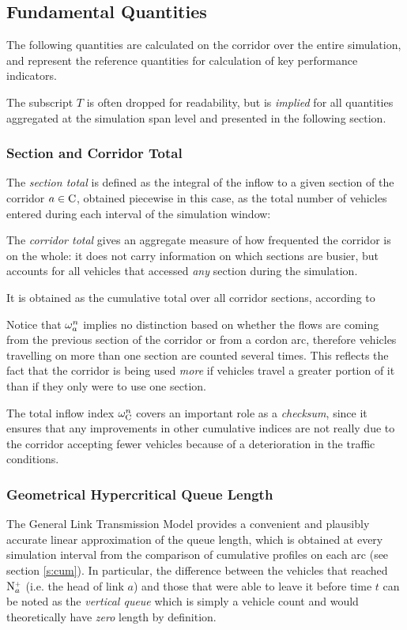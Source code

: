 \subsection{Fundamental Quantities}
The following quantities are calculated on the corridor over the entire simulation, and represent the reference quantities for calculation of key performance indicators.

The subscript $T$ is often dropped for readability, but is \emph{implied} for all quantities aggregated at the simulation span level and presented in the following section. 

\subsubsection{Section and Corridor Total}
The \emph{section total} is defined as the integral of the inflow to a given section of the corridor $a \in \mathrm{C}$, obtained piecewise in this case, as the total number of vehicles entered during each interval of the simulation window:

The \emph{corridor total} gives an aggregate measure of how frequented the corridor is on the whole: it does not carry information on which sections are busier, but accounts for all vehicles that accessed \emph{any} section during the simulation.

It is obtained as the cumulative total over all corridor sections, according to

Notice that $\omega_{a}^{n}$ implies no distinction based on whether the flows are coming from the previous section of the corridor or from a cordon arc, therefore vehicles travelling on more than one section are counted several times. 
This reflects the fact that the corridor is being used \emph{more} if vehicles travel a greater portion of it than if they only were to use one section.

The total inflow index $\omega_{\mathrm{C}}^{n}$ covers an important role as a \emph{checksum}, since it ensures that any improvements in other cumulative indices are not really due to the corridor accepting fewer vehicles because of a deterioration in the traffic conditions.

\subsubsection{Geometrical Hypercritical Queue Length} \label{s:quel}
The General Link Transmission Model provides a convenient and plausibly accurate linear approximation of the queue length, which is obtained at every simulation interval from the comparison of cumulative profiles on each arc (see section \ref{s:cum}). In particular, the difference between the vehicles that reached $\mathrm{N}_{a}^{\scriptscriptstyle{+}}$ (i.e. the head of link $a$) and those that were able to leave it before time $t$ can be noted as the \emph{vertical queue}
which is simply a vehicle count and would theoretically have \emph{zero} length by definition.

